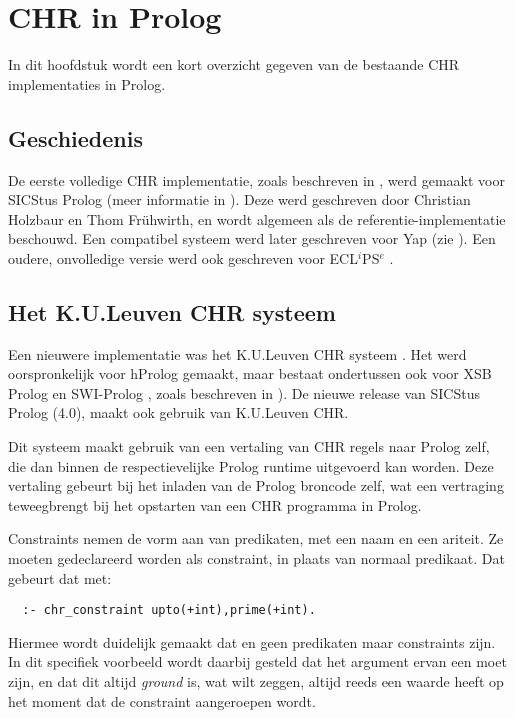 \chapter{CHR in Prolog}

In dit hoofdstuk wordt een kort overzicht gegeven van de bestaande CHR implementaties in Prolog.

\section{Geschiedenis}

De eerste volledige CHR implementatie, zoals beschreven in \cite{christian:system}, werd gemaakt voor SICStus Prolog (meer informatie in \cite{sicstus}). Deze werd geschreven door Christian Holzbaur en Thom Fr\"uhwirth, en wordt algemeen als de referentie-implementatie beschouwd. Een compatibel systeem werd later geschreven voor Yap (zie \cite{yap}). Een oudere, onvolledige versie werd ook geschreven voor ECL$^i$PS$^e$ \cite{eclipse}.

\section{Het K.U.Leuven CHR systeem}

Een nieuwere implementatie was het K.U.Leuven CHR systeem \cite{tom:kulchr}. Het werd oorspronkelijk voor hProlog gemaakt, maar bestaat ondertussen ook voor XSB Prolog \cite{xsb} en SWI-Prolog \cite{swiprolog}, zoals beschreven in \cite{tom:swi:wclp2005}). De nieuwe release van SICStus Prolog (4.0), maakt ook gebruik van K.U.Leuven CHR.

Dit systeem maakt gebruik van een vertaling van CHR regels naar Prolog zelf, die dan binnen de respectievelijke Prolog runtime uitgevoerd kan worden. Deze vertaling gebeurt bij het inladen van de Prolog broncode zelf, wat een vertraging teweegbrengt bij het opstarten van een CHR programma in Prolog.

Constraints nemen de vorm aan van predikaten, met een naam en een ariteit. Ze moeten gedeclareerd worden als constraint, in plaats van normaal predikaat. Dat gebeurt dat met: \begin{Verbatim}
  :- chr_constraint upto(+int),prime(+int).
\end{Verbatim}
Hiermee wordt duidelijk gemaakt dat  en  geen predikaten maar constraints zijn. In dit specifiek voorbeeld wordt daarbij gesteld dat het argument ervan een  moet zijn, en dat dit altijd {\em ground} is, wat wilt zeggen, altijd reeds een waarde heeft op het moment dat de constraint aangeroepen wordt.

